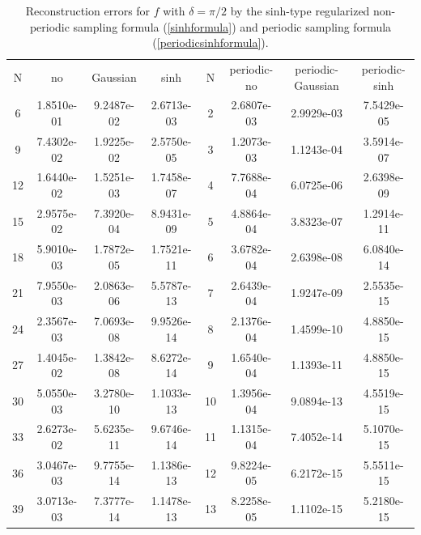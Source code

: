 \documentclass[a4paper]{article}
\numberwithin{equation}{section}
\begin{document}
\begin{table}[h]
\centering
\caption{Reconstruction errors for $f$ with $\delta = \pi/2$ by  the sinh-type regularized non-periodic sampling formula (\ref{sinhformula}) and  periodic sampling formula (\ref{periodicsinhformula}). }
\label{tab:3pi6}
\begin{tabular}{c c c c c c c c}
\toprule
{N} & {no} & {Gaussian} & {sinh} &{N} & {periodic-no}& {periodic-Gaussian} & {periodic-sinh} \\
\cmidrule(lr){2-4} \cmidrule(lr){6-8}
6  & 1.8510e-01 & 9.2487e-02 & 2.6713e-03 & 2  & 2.6807e-03 & 2.9929e-03 & 7.5429e-05 \\
9  & 7.4302e-02 & 1.9225e-02 & 2.5750e-05 & 3  & 1.2073e-03 & 1.1243e-04 & 3.5914e-07 \\
12 & 1.6440e-02 & 1.5251e-03 & 1.7458e-07 & 4  & 7.7688e-04 & 6.0725e-06 & 2.6398e-09 \\
15 & 2.9575e-02 & 7.3920e-04 & 8.9431e-09 & 5  & 4.8864e-04 & 3.8323e-07 & 1.2914e-11 \\
18 & 5.9010e-03 & 1.7872e-05 & 1.7521e-11 & 6  & 3.6782e-04 & 2.6398e-08 & 6.0840e-14 \\
21 & 7.9550e-03 & 2.0863e-06 & 5.5787e-13 & 7  & 2.6439e-04 & 1.9247e-09 & 2.5535e-15 \\
24 & 2.3567e-03 & 7.0693e-08 & 9.9526e-14 & 8  & 2.1376e-04 & 1.4599e-10 & 4.8850e-15 \\
27 & 1.4045e-02 & 1.3842e-08 & 8.6272e-14 & 9  & 1.6540e-04 & 1.1393e-11 & 4.8850e-15 \\
30 & 5.0550e-03 & 3.2780e-10 & 1.1033e-13 & 10 & 1.3956e-04 & 9.0894e-13 & 4.5519e-15 \\
33 & 2.6273e-02 & 5.6235e-11 & 9.6746e-14 & 11 & 1.1315e-04 & 7.4052e-14 & 5.1070e-15 \\
36 & 3.0467e-03 & 9.7755e-14 & 1.1386e-13 & 12 & 9.8224e-05 & 6.2172e-15 & 5.5511e-15 \\
39 & 3.0713e-03 & 7.3777e-14 & 1.1478e-13 & 13 & 8.2258e-05 & 1.1102e-15 & 5.2180e-15 \\
\bottomrule
\end{tabular}

\end{table}

\end{document}
